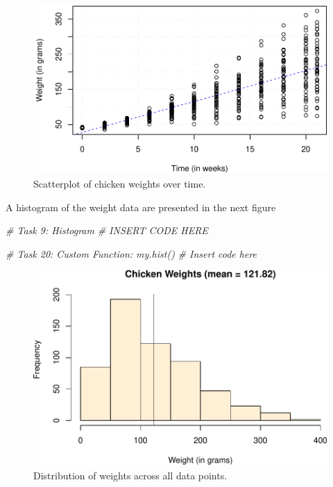 \documentclass[english,man]{apa6}
\newenvironment{Shaded}{\begin{snugshade}}{\end{snugshade}}
\newcommand{\CommentTok}[1]{\textcolor[rgb]{0.56,0.35,0.01}{\textit{{#1}}}}
\begin{document}
\begin{figure}[htbp]
\centering
\includegraphics{finalpaper_example_files/figure-latex/unnamed-chunk-16-1.pdf}
\caption{\label{fig:unnamed-chunk-16}Scatterplot of chicken weights over
time.}
\end{figure}

A histogram of the weight data are presented in the next figure

\begin{Shaded}
\begin{Highlighting}[]
\CommentTok{# Task 9: Histogram}
\CommentTok{# INSERT CODE HERE}


\CommentTok{# Task 20: Custom Function: my.hist()}
\CommentTok{# Insert code here}
\end{Highlighting}
\end{Shaded}

\begin{figure}[htbp]
\centering
\includegraphics{finalpaper_example_files/figure-latex/unnamed-chunk-18-1.pdf}
\caption{\label{fig:unnamed-chunk-18}Distribution of weights across all data
points.}
\end{figure}
\end{document}
